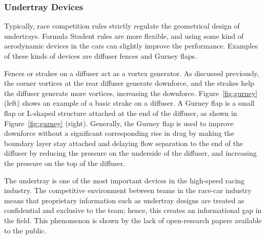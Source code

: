 \subsubsection{Undertray Devices}
Typically, race competition rules strictly regulate the geometrical design of undertrays. Formula Student rules are more flexible, and using some kind of aerodynamic devices in the cars can slightly improve the performance. Examples of these kinds of devices are diffuser fences and Gurney flaps.

\noindent Fences or strakes on a diffuser act as a vortex generator. As discussed previously, the corner vortices at the rear diffuser generate downforce, and the strakes help the diffuser generate more vortices, increasing the downforce. Figure~\ref{fig:gurney} (left) shows an example of a basic strake on a diffuser. A Gurney flap is a small flap or L-shaped structure attached at the end of the diffuser, as shown in Figure~\ref{fig:gurney} (right). Generally, the Gurney flap is used to improve downforce without a significant corresponding rise in drag \cite{Willemsen2012CFD-basedDiffuser} by making the boundary layer stay attached and delaying flow separation to the end of the diffuser by reducing the pressure on the underside of the diffuser, and increasing the pressure on the top of the diffuser. 

\noindent The undertray is one of the most important devices in the high-speed racing industry. The competitive environment between teams in the race-car industry means that proprietary information such as undertray designs are treated as confidential and exclusive to the team; hence, this creates an informational gap in the field. This phenomenon is shown by the lack of open-research papers available to the public.

